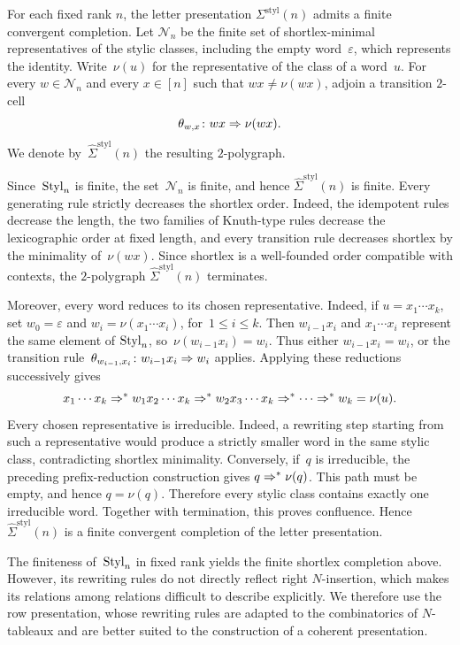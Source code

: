 \documentclass[a4paper, twoside, 11pt, english]{article}
\begin{document}
\begin{remark}
\label{R:FiniteCompletionLetterPresentation}
For each fixed rank $n$, the letter presentation
$\Sigma^{\mathrm{styl}}(n)$ admits a finite convergent completion.
Let $\mathcal N_n$ be the finite set of shortlex-minimal representatives of
the stylic classes, including the empty word~$\varepsilon$, which represents
the identity.  Write~$\nu(u)$ for the representative of the class of a
word~$u$. For every $w\in\mathcal N_n$ and every $x\in[n]$ such that
$wx\neq\nu(wx)$, adjoin a transition $2$-cell
\[
\theta_{w,x}\colon wx\Rightarrow\nu(wx).
\]
We denote by~$\widehat{\Sigma}^{\mathrm{styl}}(n)$ the resulting
$2$-polygraph.

Since~$\mathrm{Styl}_n$ is finite, the set~$\mathcal N_n$ is finite, and hence
$\widehat{\Sigma}^{\mathrm{styl}}(n)$ is finite. Every generating rule
strictly decreases the shortlex order. Indeed, the idempotent rules decrease
the length, the two families of Knuth-type rules decrease the lexicographic
order at fixed length, and every transition rule decreases shortlex by the
minimality of~$\nu(wx)$. Since shortlex is a well-founded order compatible
with contexts, the $2$-polygraph
$\widehat{\Sigma}^{\mathrm{styl}}(n)$ terminates.

Moreover, every word reduces to its chosen representative. Indeed, if
$u=x_1\cdots x_k$, set $w_0=\varepsilon$ and
$w_i=\nu(x_1\cdots x_i)$,  for~$1\le i\le k$.
Then $w_{i-1}x_i$ and $x_1\cdots x_i$ represent the same element of
$\mathrm{Styl}_n$, so~$\nu(w_{i-1}x_i)=w_i$.
Thus either $w_{i-1}x_i=w_i$, or the transition rule~$\theta_{w_{i-1},x_i}\colon w_{i-1}x_i\Rightarrow w_i$
applies. Applying these reductions successively gives
\[
x_1\cdots x_k
\Rightarrow^\ast
w_1x_2\cdots x_k
\Rightarrow^\ast
w_2x_3\cdots x_k
\Rightarrow^\ast
\cdots
\Rightarrow^\ast
w_k
=
\nu(u).
\]
Every chosen representative is irreducible. Indeed, a rewriting step starting from
such a representative would produce a strictly smaller word in the same
stylic class, contradicting shortlex minimality. Conversely, if~$q$ is
irreducible, the preceding prefix-reduction construction gives
$q\Rightarrow^\ast\nu(q)$. This path must be empty, and hence $q=\nu(q)$.
Therefore every stylic class contains exactly one irreducible word. Together
with termination, this proves confluence. Hence
$\widehat{\Sigma}^{\mathrm{styl}}(n)$ is a finite convergent completion of
the letter presentation.

The finiteness of~$\mathrm{Styl}_n$ in fixed rank yields the finite shortlex completion above. However, its rewriting rules do not directly reflect right $N$-insertion, which makes its relations among relations difficult to describe explicitly. We therefore use the row presentation, whose rewriting rules are adapted
to the combinatorics of $N$-tableaux and are better suited to the construction of a coherent presentation.
\end{remark}
\end{document}

